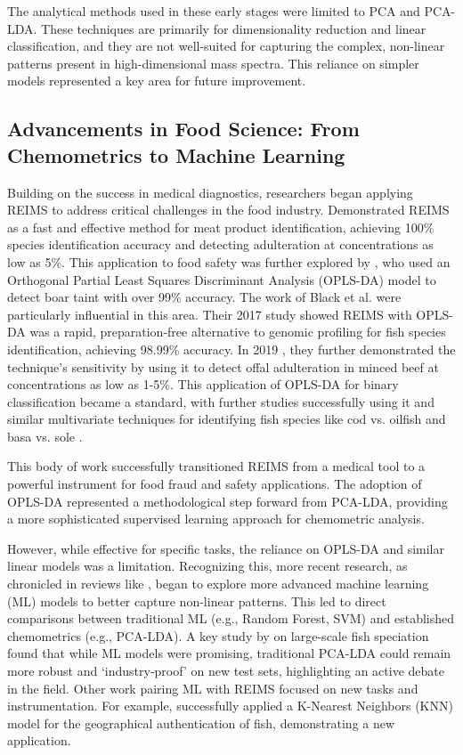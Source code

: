 The analytical methods used in these early stages were limited to PCA and PCA-LDA. These techniques are primarily for dimensionality reduction and linear classification, and they are not well-suited for capturing the complex, non-linear patterns present in high-dimensional mass spectra. This reliance on simpler models represented a key area for future improvement.

\subsection{Advancements in Food Science: From Chemometrics to Machine Learning}

Building on the success in medical diagnostics, researchers began applying REIMS to address critical challenges in the food industry.
\cite{Balog2016} Demonstrated REIMS as a fast and effective method for meat product identification, achieving 100\% species identification accuracy and detecting adulteration at concentrations as low as 5\%. This application to food safety was further explored by
\cite{Verplanken2016}, who used an Orthogonal Partial Least Squares Discriminant Analysis (OPLS-DA) model to detect boar taint with over 99\% accuracy. The work of
Black et al. were particularly influential in this area. Their 2017 study \citep{Black2017} showed REIMS with OPLS-DA was a rapid, preparation-free alternative to genomic profiling for fish species identification, achieving 98.99\% accuracy. In 2019 \citep{Black2019}, they further demonstrated the technique's sensitivity by using it to detect offal adulteration in minced beef at concentrations as low as 1-5\%. This application of OPLS-DA for binary classification became a standard, with further studies successfully using it and similar multivariate techniques for identifying fish species like cod vs. oilfish \citep{Shen2020} and basa vs. sole \citep{Shen2022}.

This body of work successfully transitioned REIMS from a medical tool to a powerful instrument for food fraud and safety applications. The adoption of OPLS-DA represented a methodological step forward from PCA-LDA, providing a more sophisticated supervised learning approach for chemometric analysis.

However, while effective for specific tasks, the reliance on OPLS-DA and similar linear models was a limitation. Recognizing this, more recent research, as chronicled in reviews like \cite{Xue2025}, began to explore more advanced machine learning (ML) models to better capture non-linear patterns. This led to direct comparisons between traditional ML (e.g., Random Forest, SVM) and established chemometrics (e.g., PCA-LDA). A key study by \cite{De2023} on large-scale fish speciation found that while ML models were promising, traditional PCA-LDA could remain more robust and `industry-proof' on new test sets, highlighting an active debate in the field. Other work pairing ML with REIMS focused on new tasks and instrumentation. For example, \cite{Lu2024} successfully applied a K-Nearest Neighbors (KNN) model for the geographical authentication of fish, demonstrating a new application.

